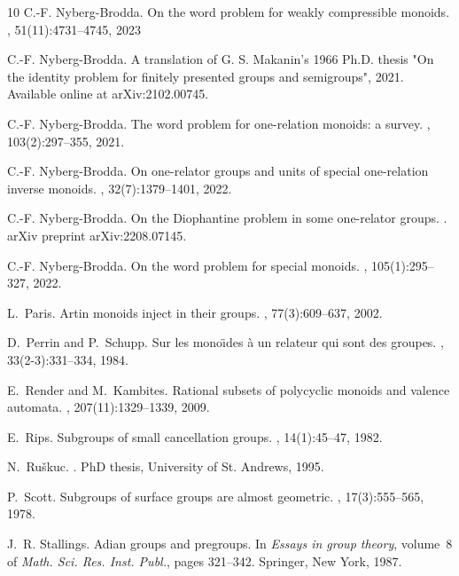 \documentclass{amsart}
\theoremstyle{plain}
\theoremstyle{definition}
\begin{document}
\begin{thebibliography}{10}
C.-F. Nyberg-Brodda.
\newblock On the word problem for weakly compressible monoids.
, 51(11):4731--4745, 2023

C.-F. Nyberg-Brodda.
\newblock A translation of {G. S. Makanin's 1966 Ph.D.} thesis "{On} the
  identity problem for finitely presented groups and semigroups", 2021.
\newblock Available online at arXiv:2102.00745.

C.-F. Nyberg-Brodda.
\newblock The word problem for one-relation monoids: a survey.
, 103(2):297--355, 2021.

C.-F. Nyberg-Brodda.
\newblock On one-relator groups and units of special one-relation inverse
  monoids.
, 32(7):1379--1401, 2022.

C.-F. Nyberg-Brodda.
\newblock On the {D}iophantine problem in some one-relator groups.
.
\newblock arXiv preprint arXiv:2208.07145.

C.-F. Nyberg-Brodda.
\newblock On the word problem for special monoids.
, 105(1):295--327, 2022.

L.~Paris.
\newblock Artin monoids inject in their groups.
, 77(3):609--637, 2002.

D.~Perrin and P.~Schupp.
\newblock Sur les mono\"{\i}des \`a un relateur qui sont des groupes.
, 33(2-3):331--334, 1984.

E.~Render and M.~Kambites.
\newblock Rational subsets of polycyclic monoids and valence automata.
, 207(11):1329--1339, 2009.

E.~Rips.
\newblock Subgroups of small cancellation groups.
, 14(1):45--47, 1982.

N.~Ru{\v{s}}kuc.
.
\newblock PhD thesis, University of St. Andrews, 1995.

P.~Scott.
\newblock Subgroups of surface groups are almost geometric.
, 17(3):555--565, 1978.

J.~R. Stallings.
\newblock Adian groups and pregroups.
\newblock In {\em Essays in group theory}, volume~8 of {\em Math. Sci. Res.
  Inst. Publ.}, pages 321--342. Springer, New York, 1987.


\end{thebibliography}
\end{document}
